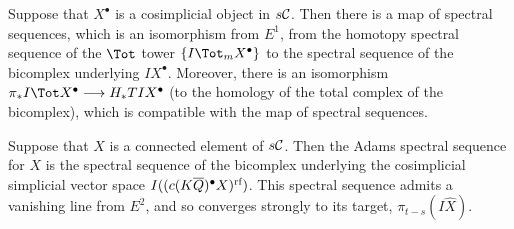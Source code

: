 \documentclass[10pt]{article}
\newcommand{\Comm}{\calC}
\begin{document}
\begin{TotalisationInSAlg}
\begin{cor}
Suppose that $X^\bullet$ is a cosimplicial object in $s\Comm$. Then there is a map of spectral sequences, which is an isomorphism from $E^1$, from the homotopy spectral sequence of the $\Tot$ tower $\{I\Tot_mX^\bullet\}$ to the spectral sequence of the bicomplex underlying $IX^\bullet$. Moreover, there is an isomorphism $\pi_*I\Tot X^\bullet\to H_*TIX^\bullet$ (to the homology of the total complex of the bicomplex), which is compatible with the map of spectral sequences.
\end{cor}
\begin{cor}
Suppose that $X$ is a connected element of $s\Comm$. Then the Adams spectral sequence for $X$ is the spectral sequence of the bicomplex underlying the cosimplicial simplicial vector space $I((c(K\overline{Q})^\bullet X)^{\textup{rf}})$. This spectral sequence admits a vanishing line from $E^2$, and so converges strongly to its target, $\pi_{t-s}(I\hat X)$.
\end{cor}
\end{TotalisationInSAlg}



\begin{Endmatter}
\printbibliography
\end{Endmatter}
\end{document}
